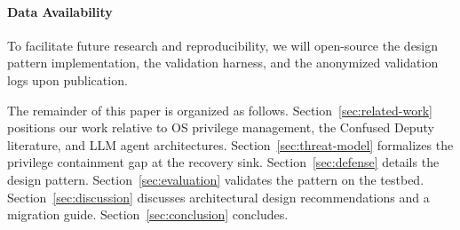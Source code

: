 \paragraph{Data Availability}
To facilitate future research and reproducibility, we will open-source the design pattern implementation, the validation harness, and the anonymized validation logs upon publication.

The remainder of this paper is organized as follows. Section~\ref{sec:related-work} positions our work relative to OS privilege management, the Confused Deputy literature, and LLM agent architectures. Section~\ref{sec:threat-model} formalizes the privilege containment gap at the recovery sink. Section~\ref{sec:defense} details the \reauthgate{} design pattern. Section~\ref{sec:evaluation} validates the pattern on the testbed. Section~\ref{sec:discussion} discusses architectural design recommendations and a migration guide. Section~\ref{sec:conclusion} concludes.
